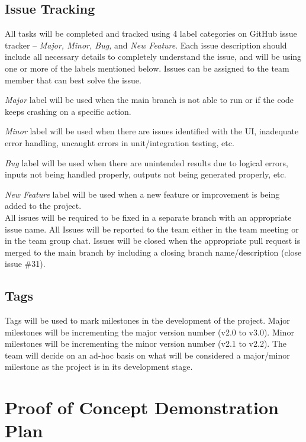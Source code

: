 \documentclass{article}
\begin{document}
\subsection{Issue Tracking}
All tasks will be completed and tracked using 4 label categories on GitHub issue tracker – \emph{Major, Minor, Bug,} and \emph{New Feature}. Each issue description should include all necessary details to completely understand the issue, and will be using one or more of the labels mentioned below. Issues can be assigned to the team member that can best solve the issue.

\emph{Major} label will be used when the main branch is not able to run or if the code keeps crashing on a specific action.

\emph{Minor} label will be used when there are issues identified with the UI, inadequate error handling, uncaught errors in unit/integration testing, etc.

\emph{Bug} label will be used when there are unintended results due to logical errors, inputs not being handled properly, outputs not being generated properly, etc.

\emph{New Feature} label will be used when a new feature or improvement is being added to the project.
\\All issues will be required to be fixed in a separate branch with an appropriate issue name. All Issues will be reported to the team either in the team meeting or in the team group chat. Issues will be closed when the appropriate pull request is merged to the main branch by including a closing branch name/description (close issue \#31).

\subsection{Tags}
Tags will be used to mark milestones in the development of the project. Major milestones will be incrementing the major version number (v2.0 to v3.0). Minor milestones will be incrementing the minor version number (v2.1 to v2.2). The team will decide on an ad-hoc basis on what will be considered a major/minor milestone as the project is in its development stage.

\section{Proof of Concept Demonstration Plan}
\end{document}
